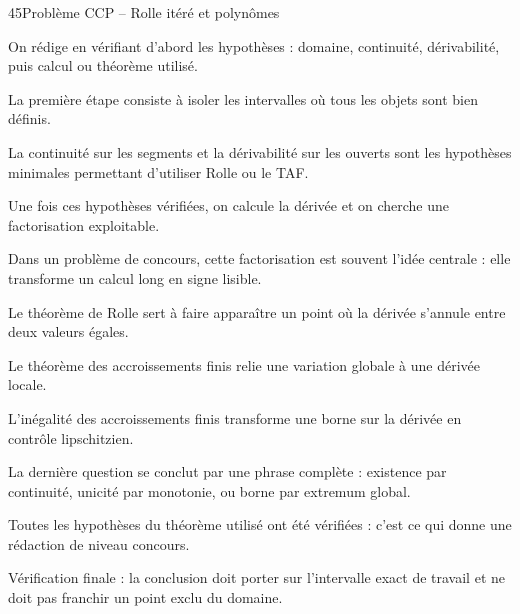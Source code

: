 \documentclass[11pt,a4paper]{article}
\begin{document}
\begin{corrbox}{45}{Problème CCP -- Rolle itéré et polynômes}

\begin{methodebox}
On rédige en vérifiant d'abord les hypothèses : domaine, continuité, dérivabilité, puis calcul ou théorème utilisé.
\end{methodebox}

La première étape consiste à isoler les intervalles où tous les objets sont bien définis.


La continuité sur les segments et la dérivabilité sur les ouverts sont les hypothèses minimales permettant d'utiliser Rolle ou le TAF.


Une fois ces hypothèses vérifiées, on calcule la dérivée et on cherche une factorisation exploitable.


Dans un problème de concours, cette factorisation est souvent l'idée centrale : elle transforme un calcul long en signe lisible.


Le théorème de Rolle sert à faire apparaître un point où la dérivée s'annule entre deux valeurs égales.


Le théorème des accroissements finis relie une variation globale à une dérivée locale.


L'inégalité des accroissements finis transforme une borne sur la dérivée en contrôle lipschitzien.


La dernière question se conclut par une phrase complète : existence par continuité, unicité par monotonie, ou borne par extremum global.


Toutes les hypothèses du théorème utilisé ont été vérifiées : c'est ce qui donne une rédaction de niveau concours.


\begin{attentionbox}
Vérification finale : la conclusion doit porter sur l'intervalle exact de travail et ne doit pas franchir un point exclu du domaine.
\end{attentionbox}

\end{corrbox}
\end{document}

